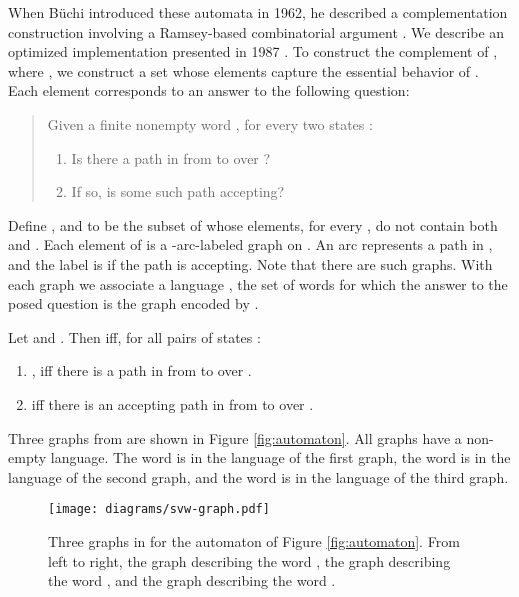 \documentclass{LMCS}
\newcommand\buchi{B\"uchi }
\begin{document}
When \buchi introduced these automata in 1962, he described a complementation
construction involving a Ramsey-based combinatorial argument \cite{Buc62}. We describe an
optimized implementation presented in 1987 \cite{SVW85}.  To construct the complement of
, where  , we
construct a set  whose elements capture the essential behavior of
.  Each element corresponds to an answer to the following question:

\begin{verse}
Given a finite nonempty word , for every two states :
\begin{enumerate}
\item Is there a path in  from  to  over ?
\item If so, is some such path accepting?
\end{enumerate}
\end{verse}

Define , and  to be the subset of 
whose elements, for every , do not contain both  and .  Each
element of  is a -arc-labeled graph on . An arc represents a path in ,
and the label is  if the path is accepting. Note that there are  such graphs.  With each
graph  we associate a language , the set of words for
which the answer to the posed question is the graph encoded by . 

\begin{defi}\label{X_Describes}
Let  and . Then 
iff, for all pairs of states :
\begin{enumerate}[(1)]
\item , iff there is a path in 
from  to  over .
\item  iff there is an accepting path in  from
 to  over .
\end{enumerate} 
\end{defi}

\begin{exa}
Three graphs from  are shown in Figure \ref{fig:automaton}. All graphs have a
non-empty language. The word  is in the language of the first graph, the word  is in the
language of the second graph, and the word  is in the language of the third graph. 
\end{exa}

\begin{figure}[tb]
\begin{center}
{\texttt{[image: diagrams/svw-graph.pdf]}}
\end{center}
\caption{Three graphs in  for the automaton of Figure \ref{fig:automaton}. From left to
right, the graph describing the word , the graph describing the word , and the graph
describing the word .}  \label{fig:svw-graph}
\end{figure}
\end{document}
